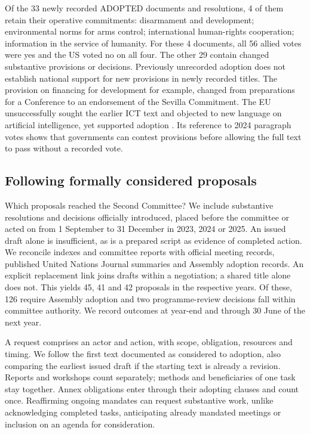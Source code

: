 \documentclass[10pt,authoryear]{elsarticle}
\begin{document}
Of the 33 newly recorded ADOPTED documents and resolutions, 4 of them retain their operative commitments: disarmament and development; environmental norms for arms control; international human-rights cooperation; information in the service of humanity. For these 4 documents, all 56 allied votes were yes and the US voted no on all four. The other 29 contain changed substantive provisions or decisions. Previously unrecorded adoption does not establish national support for new provisions in newly recorded titles. The provision on financing for development for example, changed from preparations for a Conference to an endorsement of the Sevilla Commitment. The EU unsuccessfully sought the earlier ICT text and objected to new language on artificial intelligence, yet supported adoption \citep{eu:2025:ict}. Its reference to 2024 paragraph votes shows that governments can contest provisions before allowing the full text to pass without a recorded vote.

\subsection{Following formally considered proposals}
\label{sec:proposal_methods}

Which proposals reached the Second Committee? We include substantive resolutions and decisions officially introduced, placed before the committee or acted on from 1 September to 31 December in 2023, 2024 or 2025. An issued draft alone is insufficient, as is a prepared script as evidence of completed action. We reconcile indexes and committee reports with official meeting records, published United Nations Journal summaries and Assembly adoption records. An explicit replacement link joins drafts within a negotiation; a shared title alone does not. This yields 45, 41 and 42 proposals in the respective years. Of these, 126 require Assembly adoption and two programme-review decisions fall within committee authority. We record outcomes at year-end and through 30 June of the next year.

A request comprises an actor and action, with scope, obligation, resources and timing. We follow the first text documented as considered to adoption, also comparing the earliest issued draft if the starting text is already a revision. Reports and workshops count separately; methods and beneficiaries of one task stay together. Annex obligations enter through their adopting clauses and count once. Reaffirming ongoing mandates can request substantive work, unlike acknowledging completed tasks, anticipating already mandated meetings or inclusion on an agenda for consideration.
\end{document}
